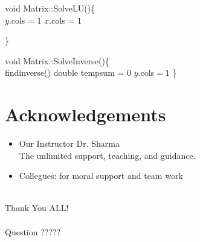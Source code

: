 \documentclass[12pt]{beamer}
\begin{document}
\begin{frame}
       \begin{algorithm}[H]
       void Matrix::SolveLU()\{\\
       $y$.cols = $1$\;
       $x$.cols = $1$\;
       \end{algorithm}
       \end{frame}
       \begin{frame}
       \begin{algorithm}[H]
       \}
       \end{algorithm}
\end{frame}	
       
       
  \begin{frame}
       \begin{algorithm}[H]
       void Matrix::SolveInverse()\{\\
       findinverse()\;
       double tempsum = 0\;
              	$y$.cols$=1$\;
      \}
       \end{algorithm}
       \end{frame}
       
  \section{Acknowledgements}
  \begin{frame}
  \begin{center}
 \begin{itemize}
   \item Our Instructor Dr. Sharma\\
         The unlimited support, teaching, and guidance.\\
         
   \item Collegues: for moral support and team work
   
 \end{itemize}
 ~\\
 Thank You ALL!\\
 ~\\ 
 Question ?????
   \end{center}
  \end{frame}
\end{document}
